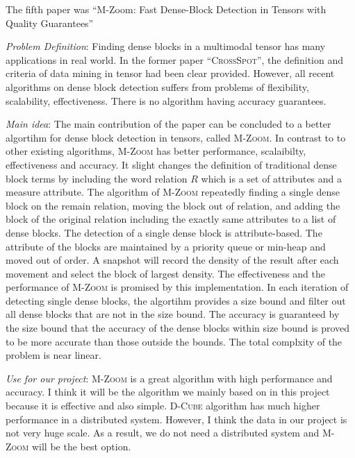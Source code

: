 \newpage
The fifth paper was ``M-Zoom: Fast Dense-Block Detection in Tensors with Quality Guarantees''

\begin{itemize*}
\item {\em Problem Definition}: Finding dense blocks in a multimodal tensor has many applications in real world. In the former paper ``\textsc{CrossSpot}'', the definition and criteria  of data mining in tensor had been clear provided. However, all recent algorithms on dense block detection suffers from problems of flexibility, scalability, effectiveness. There is no algorithm having accuracy guarantees.\\

\item {\em Main idea}: The main contribution of the paper can be concluded to a better algortihm for dense block detection in tensors, called \textsc{M-Zoom}. In contrast to to other existing algorithms, \textsc{M-Zoom} has better performance, scalaibilty, effectiveness and accuracy. It slight changes the definition of traditional dense block terms by including the word relation $R$ which is a set of attributes and a measure attribute. The algorithm of \textsc{M-Zoom} repeatedly finding a single dense block on the remain relation, moving the block out of relation, and adding the block of the original relation including the exactly same attributes to a list of dense blocks. The detection of a single dense block is attribute-based. The attribute of the blocks are maintained by a priority queue or min-heap and moved out of order. A snapshot will record the density of the result after each movement and select the block of largest density. The effectiveness and the performance of \textsc{M-Zoom} is promised by this implementation. In each iteration of detecting single dense blocks, the algortihm provides a size bound and filter out all dense blocks that are not in the size bound. The accuracy is guaranteed by the size bound that the accuracy of the dense blocks within size bound is proved to be more accurate than those outside the bounds. The total complxity of the problem is near linear.\\

\item {\em Use for our project}:
      \textsc{M-Zoom} is a great algorithm with high performance and accuracy. I think it will be the algorithm we mainly based on in this project because it is effective and also simple. \textsc{D-Cube} algorithm has much higher performance in a distributed system. However, I think the data in our project is not very huge scale. As a result, we do not need a distributed system and \textsc{M-Zoom} will be the best option. \\
      

\end{itemize*}
